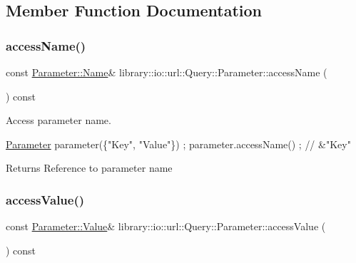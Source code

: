 \subsection{Member Function Documentation}
\mbox{\label{classlibrary_1_1io_1_1url_1_1_query_1_1_parameter_af91c3c51b261c00262d91f927620cdd2}} 
\subsubsection{\texorpdfstring{access\+Name()}{accessName()}}
{\footnotesize\ttfamily const \hyperlink{classlibrary_1_1io_1_1url_1_1_query_1_1_parameter_a7edf5fb8a4ae57aed1ce5dfa2405c981}{Parameter\+::\+Name}\& library\+::io\+::url\+::\+Query\+::\+Parameter\+::access\+Name (\begin{DoxyParamCaption}{ }\end{DoxyParamCaption}) const}



Access parameter name. 


\begin{DoxyCode}
\hyperlink{classlibrary_1_1io_1_1url_1_1_query_1_1_parameter_ad6160646a07cb92213403426dbba4c64}{Parameter} parameter(\{\textcolor{stringliteral}{"Key"}, \textcolor{stringliteral}{"Value"}\}) ;
parameter.accessName() ; \textcolor{comment}{// &"Key"}
\end{DoxyCode}


\begin{DoxyReturn}{Returns}
Reference to parameter name 
\end{DoxyReturn}
\mbox{\label{classlibrary_1_1io_1_1url_1_1_query_1_1_parameter_a7268480834dd6515abe02c4602a9382f}} 
\subsubsection{\texorpdfstring{access\+Value()}{accessValue()}}
{\footnotesize\ttfamily const \hyperlink{classlibrary_1_1io_1_1url_1_1_query_1_1_parameter_a46e7a7b97d44f51f83d6261f70ba0a5e}{Parameter\+::\+Value}\& library\+::io\+::url\+::\+Query\+::\+Parameter\+::access\+Value (\begin{DoxyParamCaption}{ }\end{DoxyParamCaption}) const}



